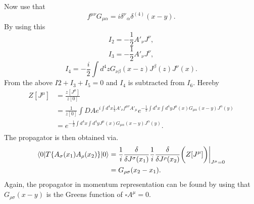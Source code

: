 Now use that
\begin{equation}
	f^{\mu\nu}G_{\mu\alpha}=i\delta^\nu_{\,\,\,\,\alpha}\delta^{(4)}(x-y).
\end{equation} 
By using this
\begin{equation}
	I_2=-\frac{1}{2}A'_\nu J^\nu,
\end{equation} 
\begin{equation}
	I_3=-\frac{1}{2}A'_\nu J^\nu,
\end{equation} 
\begin{equation}
	I_4=-\frac{i}{2}\int d^4z G_{\nu\beta}(x-z)J^\beta(z)J^\nu(x).
\end{equation} 
From the above $I2+I_3+I_5=0$ and $I_4$ is subtracted from $I_6$. Hereby
\begin{equation}
	\begin{split}
		Z[J^\mu]&=\frac{z[J^\mu]}{z[0]}\\
		&=\frac{1}{z[0]}\int DAe^{i\int d^4x\frac{1}{2}A'_\nu f^{\mu\nu}A'_\mu}e^{-\frac{1}{2}\int d^4x\int d^4y J^\mu(x)G_{\mu\alpha}(x-y)J^\alpha(y)}\\
		&=e^{-\frac{1}{2}\int d^4x\int d^4y J^\mu(x)G_{\mu\alpha}(x-y)J^\alpha(y)}.\\
	\end{split}
\end{equation} 
The propagator is then obtained via.
\begin{equation}
	\begin{split}
		\braket{0|T\{A_\sigma(x_1)A_\rho(x_2)\}|0}&=\frac{1}{i}\frac{\delta}{\delta J^\sigma(x_1)}\frac{1}{i}\frac{\delta}{\delta J^\rho(x_2)}\bigg(Z[J^\mu]\bigg)\bigg|_{J^\mu=0}\\
		&=G_{\rho\sigma}(x_2-x_1).
	\end{split}
\end{equation} 
Again, the propagator in momentum representation can be found by using that $G_{\rho\sigma}(x-y)$ is the Greens function of $\square A^\mu=0$. 


